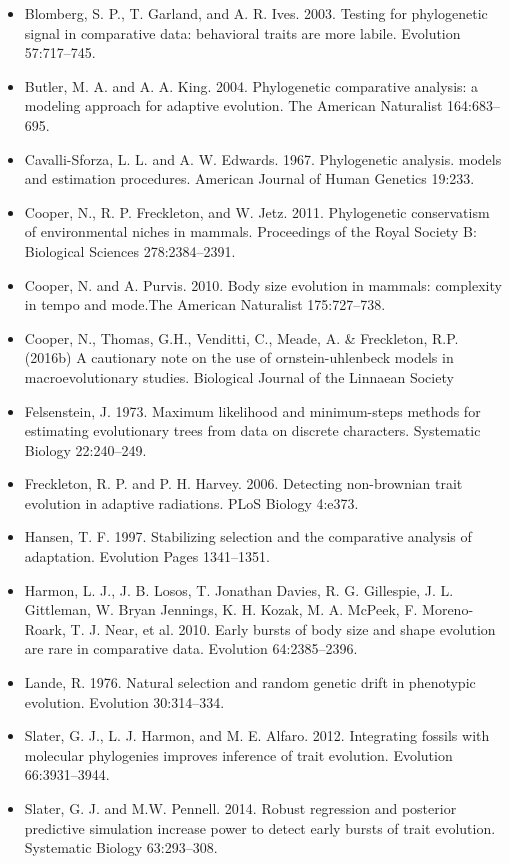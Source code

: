 \documentclass[]{book}
\providecommand{\tightlist}{%
  \setlength{\itemsep}{0pt}\setlength{\parskip}{0pt}}
\begin{document}
\begin{itemize}
\tightlist
\item
  Blomberg, S. P., T. Garland, and A. R. Ives. 2003. Testing for
  phylogenetic signal in comparative data: behavioral traits are more
  labile. Evolution 57:717--745.
\item
  Butler, M. A. and A. A. King. 2004. Phylogenetic comparative analysis:
  a modeling approach for adaptive evolution. The American Naturalist
  164:683--695.
\item
  Cavalli-Sforza, L. L. and A. W. Edwards. 1967. Phylogenetic analysis.
  models and estimation procedures. American Journal of Human Genetics
  19:233.
\item
  Cooper, N., R. P. Freckleton, and W. Jetz. 2011. Phylogenetic
  conservatism of environmental niches in mammals. Proceedings of the
  Royal Society B: Biological Sciences 278:2384--2391.
\item
  Cooper, N. and A. Purvis. 2010. Body size evolution in mammals:
  complexity in tempo and mode.The American Naturalist 175:727--738.
\item
  Cooper, N., Thomas, G.H., Venditti, C., Meade, A. \& Freckleton, R.P.
  (2016b) A cautionary note on the use of ornstein-uhlenbeck models in
  macroevolutionary studies. Biological Journal of the Linnaean Society
\item
  Felsenstein, J. 1973. Maximum likelihood and minimum-steps methods for
  estimating evolutionary trees from data on discrete characters.
  Systematic Biology 22:240--249.
\item
  Freckleton, R. P. and P. H. Harvey. 2006. Detecting non-brownian trait
  evolution in adaptive radiations. PLoS Biology 4:e373.
\item
  Hansen, T. F. 1997. Stabilizing selection and the comparative analysis
  of adaptation. Evolution Pages 1341--1351.
\item
  Harmon, L. J., J. B. Losos, T. Jonathan Davies, R. G. Gillespie, J. L.
  Gittleman, W. Bryan Jennings, K. H. Kozak, M. A. McPeek, F.
  Moreno-Roark, T. J. Near, et al. 2010. Early bursts of body size and
  shape evolution are rare in comparative data. Evolution 64:2385--2396.
\item
  Lande, R. 1976. Natural selection and random genetic drift in
  phenotypic evolution. Evolution 30:314--334.
\item
  Slater, G. J., L. J. Harmon, and M. E. Alfaro. 2012. Integrating
  fossils with molecular phylogenies improves inference of trait
  evolution. Evolution 66:3931--3944.
\item
  Slater, G. J. and M.W. Pennell. 2014. Robust regression and posterior
  predictive simulation increase power to detect early bursts of trait
  evolution. Systematic Biology 63:293--308.
\end{itemize}
\end{document}
